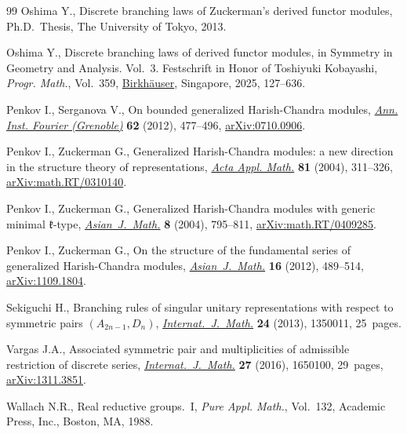 \documentclass[pdftex]{sigma}
\numberwithin{equation}{section}
\theoremstyle{definition}
\begin{document}
\begin{thebibliography}{99}
Oshima Y., Discrete branching laws of {Z}uckerman's derived functor modules,
 Ph.D.~Thesis, {T}he University of Tokyo, 2013.

Oshima Y., Discrete branching laws of derived functor modules, in Symmetry in
 Geometry and Analysis. {V}ol.~3. {F}estschrift in Honor of {T}oshiyuki
 {K}obayashi, \textit{Progr. Math.}, Vol.~359,
 \href{https://doi.org/10.1007/978-981-97-7666-5_5}{Birkh\"auser}, Singapore,
 2025, 127--636.

Penkov I., Serganova V., On bounded generalized {H}arish-{C}handra modules,
 \href{https://doi.org/10.5802/aif.2685}{\textit{Ann. Inst. Fourier
 (Grenoble)}} \textbf{62} (2012), 477--496,
 \href{http://arxiv.org/abs/0710.0906}{arXiv:0710.0906}.

Penkov I., Zuckerman G., Generalized {H}arish-{C}handra modules: a new
 direction in the structure theory of representations,
 \href{https://doi.org/10.1023/B:ACAP.0000024204.22996.2c}{\textit{Acta Appl.
 Math.}} \textbf{81} (2004), 311--326,
 \href{http://arxiv.org/abs/math.RT/0310140}{arXiv:math.RT/0310140}.

Penkov I., Zuckerman G., Generalized {H}arish-{C}handra modules with generic
 minimal {$\mathfrak{k}$}-type,
 \href{https://doi.org/10.4310/ajm.2004.v8.n4.a25}{\textit{Asian~J.~Math.}}
 \textbf{8} (2004), 795--811,
 \href{http://arxiv.org/abs/math.RT/0409285}{arXiv:math.RT/0409285}.

Penkov I., Zuckerman G., On the structure of the fundamental series of
 generalized {H}arish-{C}handra modules,
 \href{https://doi.org/10.4310/AJM.2012.v16.n3.a8}{\textit{Asian~J.~Math.}}
 \textbf{16} (2012), 489--514,
 \href{http://arxiv.org/abs/1109.1804}{arXiv:1109.1804}.

Sekiguchi H., Branching rules of singular unitary representations with respect
 to symmetric pairs {$(A_{2n-1},D_n)$},
 \href{https://doi.org/10.1142/S0129167X13500110}{\textit{Internat.~J.~Math.}}
 \textbf{24} (2013), 1350011, 25~pages.

Vargas J.A., Associated symmetric pair and multiplicities of admissible
 restriction of discrete series,
 \href{https://doi.org/10.1142/S0129167X16501007}{\textit{Internat.~J.~Math.}}
 \textbf{27} (2016), 1650100, 29~pages,
 \href{http://arxiv.org/abs/1311.3851}{arXiv:1311.3851}.

Wallach N.R., Real reductive groups.~{I}, \textit{Pure Appl. Math.}, Vol.~132,
 Academic Press, Inc., Boston, MA, 1988.

\end{thebibliography}\LastPageEnding
\end{document}
